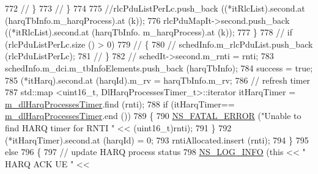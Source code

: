 \begin{DoxyCode}
{772                                         \textcolor{comment}{//                                              \}}
773                                         \textcolor{comment}{//                                      \}}
774 
775                                         \textcolor{comment}{//rlcPduListPerLc.push\_back ((*itRlcList).second.at
       (harqTbInfo.m\_harqProcess).at (k));}
776                                         rlcPduMapIt->second.push\_back ((*itRlcList).second.at (harqTbInfo.
      m\_harqProcess).at (k));
777                                 \}
778 \textcolor{comment}{//                              if (rlcPduListPerLc.size () > 0)}
779 \textcolor{comment}{//                              \{}
780 \textcolor{comment}{//                                      schedInfo.m\_rlcPduList.push\_back (rlcPduListPerLc);}
781 \textcolor{comment}{//                              \}}
782                                 \textcolor{comment}{//                              schedIt->second.m\_rnti = rnti;}
783                                 schedInfo.m\_dci.m\_tbInfoElements.push\_back (harqTbInfo);
784                                 success = \textcolor{keyword}{true};
785                                 (*itHarq).second.at (harqId).m\_rv = harqTbInfo.m\_rv;
786                                 \textcolor{comment}{// refresh timer}
787                                 std::map <uint16\_t, DlHarqProcessesTimer\_t>::iterator itHarqTimer = 
      \hyperlink{classns3_1_1MmWaveRrMacScheduler_aa52dc4680386f8ccf85d6b9c685463d1}{m\_dlHarqProcessesTimer}.find (rnti);
788                                 \textcolor{keywordflow}{if} (itHarqTimer== \hyperlink{classns3_1_1MmWaveRrMacScheduler_aa52dc4680386f8ccf85d6b9c685463d1}{m\_dlHarqProcessesTimer}.end ())
789                                 \{
790                                         \hyperlink{group__fatal_ga5131d5e3f75d7d4cbfd706ac456fdc85}{NS\_FATAL\_ERROR} (\textcolor{stringliteral}{"Unable to find HARQ timer for RNTI "}
       << (uint16\_t)rnti);
791                                 \}
792                                 (*itHarqTimer).second.at (harqId) = 0;
793                                 rntiAllocated.insert (rnti);
794                         \}
795                         \textcolor{keywordflow}{else}
796                         \{
797                                 \textcolor{comment}{// update HARQ process status}
798                                 \hyperlink{group__logging_gafbd73ee2cf9f26b319f49086d8e860fb}{NS\_LOG\_INFO} (\textcolor{keyword}{this} << \textcolor{stringliteral}{" HARQ ACK UE "} << 
}
\end{DoxyCode}
